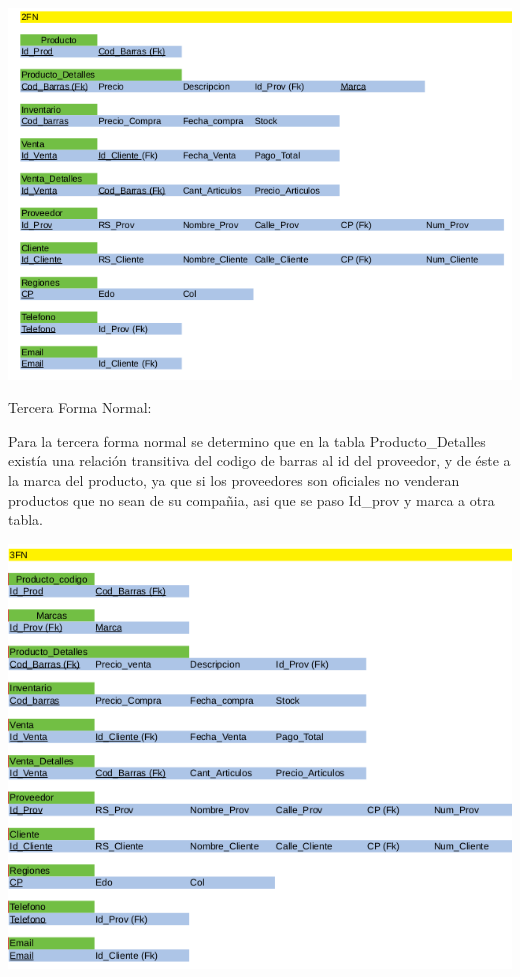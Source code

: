 \documentclass[12pt, letterpaper]{article}     %
\begin{document}
	\vspace{5mm} %
	\begin{center}
   	\includegraphics[scale=0.45]{tabla2N}
	\end{center}	
	
	Tercera Forma Normal:
	
	Para la tercera forma normal se determino que en la tabla Producto\_Detalles existía una relación transitiva del codigo de barras al id del proveedor, y de éste a la marca del producto, ya que si los proveedores son oficiales no venderan productos que no sean de su compañia, asi que se paso Id\_prov y marca  a otra tabla.
	
	\begin{center}
   	\includegraphics[scale=0.4]{tabla3N}
	\end{center}	
	
\end{document}
